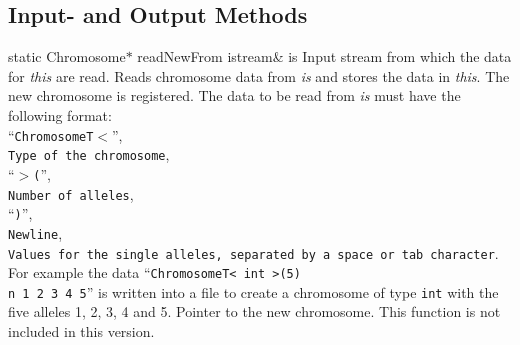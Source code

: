 \subsection{Input- and Output Methods}

    \setNormalInstance
    \printMethodWithOneParam
    {static Chromosome$\ast$} 
    {readNewFrom}
    {istream\&} 
    {is}
    {Input stream from which the data for {\em this} are read.}
    {Reads chromosome data from {\em is} and stores the data in
     {\em this}. The new chromosome is registered. The
     data to be read from {\em is} must have the following
     format:\\
     ``{\tt ChromosomeT$<$}'',\\ 
     {\tt Type of the chromosome},\\ 
     ``{\tt $>$(}'',\\ 
     {\tt Number of alleles},\\
     ``{\tt )}'',\\ 
     {\tt Newline},\\
     {\tt Values for the single alleles, separated by a space or tab
     character}.\\
     For example the data ``{\tt ChromosomeT< int >(5)\\n 1 2 3 4 5}''  
     is written into a file to create a chromosome of type {\tt int}
     with the five alleles 1, 2, 3, 4 and 5.}    
    {Pointer to the new chromosome.}
    {This function is not included in this version.}
